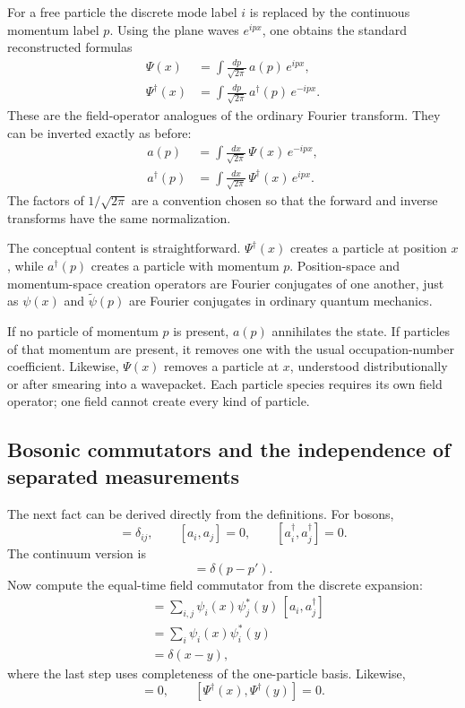 For a free particle the discrete mode label \(i\) is replaced by the continuous momentum label \(p\). Using the plane waves \(e^{ipx}\), one obtains the standard reconstructed formulas
\begin{align}
\Psi(x) &= \int \frac{dp}{\sqrt{2\pi}}\,a(p)\,e^{ipx},\\
\Psi^\dagger(x) &= \int \frac{dp}{\sqrt{2\pi}}\,a^\dagger(p)\,e^{-ipx}.
\end{align}
These are the field-operator analogues of the ordinary Fourier transform. They can be inverted exactly as before:
\begin{align}
a(p) &= \int \frac{dx}{\sqrt{2\pi}}\,\Psi(x)\,e^{-ipx},\\
a^\dagger(p) &= \int \frac{dx}{\sqrt{2\pi}}\,\Psi^\dagger(x)\,e^{ipx}.
\end{align}
The factors of \(1/\sqrt{2\pi}\) are a convention chosen so that the forward and inverse transforms have the same normalization.

The conceptual content is straightforward. \(\Psi^\dagger(x)\) creates a particle at position \(x\), while \(a^\dagger(p)\) creates a particle with momentum \(p\). Position-space and momentum-space creation operators are Fourier conjugates of one another, just as \(\psi(x)\) and \(\tilde{\psi}(p)\) are Fourier conjugates in ordinary quantum mechanics.

If no particle of momentum \(p\) is present, \(a(p)\) annihilates the state. If particles of that momentum are present, it removes one with the usual occupation-number coefficient. Likewise, \(\Psi(x)\) removes a particle at \(x\), understood distributionally or after smearing into a wavepacket. Each particle species requires its own field operator; one field cannot create every kind of particle.

\subsection{Bosonic commutators and the independence of separated measurements}

The next fact can be derived directly from the definitions. For bosons,
\begin{equation}
[a_i,a_j^\dagger]=\delta_{ij},
\qquad
[a_i,a_j]=0,
\qquad
[a_i^\dagger,a_j^\dagger]=0.
\end{equation}
The continuum version is
\begin{equation}
[a(p),a^\dagger(p')]=\delta(p-p').
\end{equation}
Now compute the equal-time field commutator from the discrete expansion:
\begin{align}
[\Psi(x),\Psi^\dagger(y)]
&= \sum_{i,j}\psi_i(x)\psi_j^*(y)\,[a_i,a_j^\dagger] \\
&= \sum_i \psi_i(x)\psi_i^*(y) \\
&= \delta(x-y),
\end{align}
where the last step uses completeness of the one-particle basis. Likewise,
\begin{equation}
[\Psi(x),\Psi(y)]=0,
\qquad
[\Psi^\dagger(x),\Psi^\dagger(y)]=0.
\end{equation}

